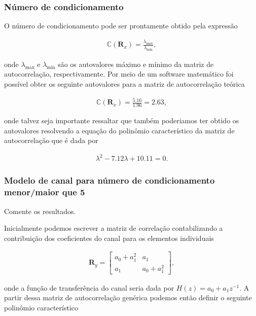 \subsubsection{Número de condicionamento}
    

        
        O número de condicionamento pode ser prontamente obtido pela expressão

        \begin{align}
            \mathbb{C} (\mathbf{R}_{x}) = \frac{\lambda_{\text{max}}}{\lambda_{\text{min}}},
        \end{align}
    
        onde $\lambda_{\text{max}}$ e $\lambda_{\text{min}}$ são os autovalores máximo e mínimo da matriz de autocorrelação, respectivamente. Por meio de um software
        matemático foi possível obter os seguinte autovalores para a matriz de autocorrelação teórica

        \begin{align}
            \mathbb{C} (\mathbf{R}_{x}) = \frac{5.16}{1.96} = 2.63,
        \end{align}

        onde talvez seja importante ressaltar que também poderiamos ter obtido os autovalores resolvendo a equação do polinômio
        característico da matriz de autocorrelação que é dada por

        \begin{align}
            \lambda^{2} - 7.12 \lambda + 10.11 = 0. 
        \end{align}


\subsubsection{Modelo de canal para número de condicionamento menor/maior que 5}
Comente os resultados.

Inicialmente podemos escrever a matriz de correlação contabilizando a contribuição dos coeficientes do canal para os elementos individuais

\begin{align}
    \mathbf{R}_{y} =
    \begin{bmatrix}
        a_{0} + a^{2}_{1} & a_{1}\\
        a_{1} & a_{0} + a^{2}_{1}
    \end{bmatrix},
\end{align}

onde a função de transferência do canal seria dada por $H(z) = a_{0} + a_{1}z^{-1}$. A partir dessa matriz de autocorrelação genérica podemos então 
definir o seguinte polinômio característico

